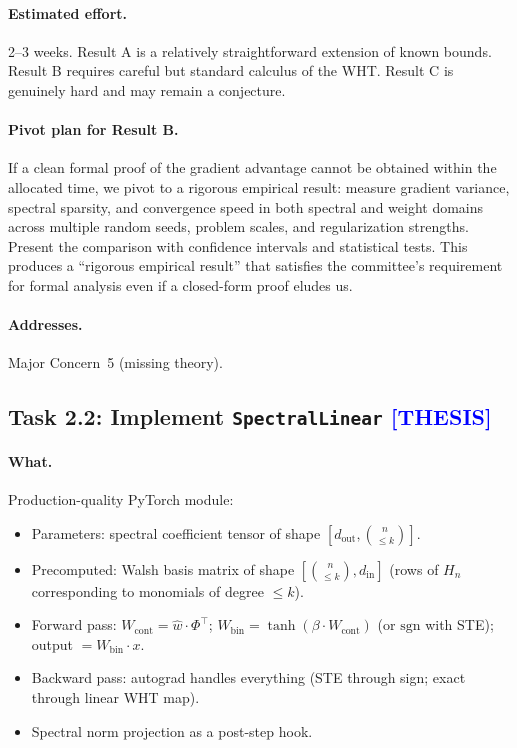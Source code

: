 \documentclass[12pt,a4paper]{article}
\newcommand{\thesis}{\texorpdfstring{\textcolor{blue}{\textbf{[THESIS]}}}{[THESIS]}}
\begin{document}
\paragraph{Estimated effort.} 2--3 weeks. Result A is a relatively straightforward extension of known bounds. Result B requires careful but standard calculus of the WHT. Result C is genuinely hard and may remain a conjecture.

\paragraph{Pivot plan for Result B.} If a clean formal proof of the gradient advantage cannot be obtained within the allocated time, we pivot to a rigorous empirical result: measure gradient variance, spectral sparsity, and convergence speed in both spectral and weight domains across multiple random seeds, problem scales, and regularization strengths. Present the comparison with confidence intervals and statistical tests. This produces a ``rigorous empirical result'' that satisfies the committee's requirement for formal analysis even if a closed-form proof eludes us.

\paragraph{Addresses.} Major Concern~5 (missing theory).


\subsection{Task 2.2: Implement \texttt{SpectralLinear} \thesis}

\paragraph{What.} Production-quality PyTorch module:
\begin{itemize}
    \item Parameters: spectral coefficient tensor of shape $[d_\text{out}, \binom{n}{\leq k}]$.
    \item Precomputed: Walsh basis matrix of shape $[\binom{n}{\leq k}, d_\text{in}]$ (rows of $H_n$ corresponding to monomials of degree $\leq k$).
    \item Forward pass: $W_\text{cont} = \hat{w} \cdot \Phi^\top$; $W_\text{bin} = \tanh(\beta \cdot W_\text{cont})$ (or $\text{sgn}$ with STE); output $= W_\text{bin} \cdot x$.
    \item Backward pass: autograd handles everything (STE through sign; exact through linear WHT map).
    \item Spectral norm projection as a post-step hook.
\end{itemize}
\end{document}
